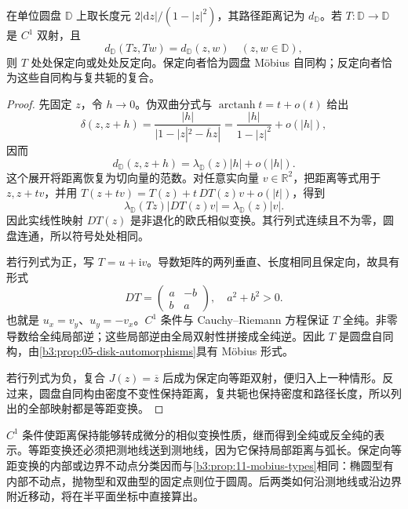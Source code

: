 \begin{proposition}[圆盘的光滑等距变换]\label{b3:prop:13-disk-isometries}
在单位圆盘 \(\mathbb D\) 上取长度元 \(2|\mathrm dz|/(1-|z|^2)\)，其路径距离记为 \(d_{\mathbb D}\)。若 \(T:\mathbb D\to\mathbb D\) 是 \(C^1\) 双射，且
\[
 d_{\mathbb D}(Tz,Tw)=d_{\mathbb D}(z,w)
 \quad(z,w\in\mathbb D),
\]
则 \(T\) 处处保定向或处处反定向。保定向者恰为圆盘 Möbius 自同构；反定向者恰为这些自同构与复共轭的复合。
\end{proposition}
\begin{proof}
先固定 \(z\)，令 \(h\to0\)。伪双曲分式与 \(\operatorname{arctanh}t=t+o(t)\) 给出
\[
 \delta(z,z+h)
 =\frac{|h|}{|1-|z|^2-\overline h z|}
 =\frac{|h|}{1-|z|^2}+o(|h|),
\]
因而
\[
 d_{\mathbb D}(z,z+h)
 =\lambda_{\mathbb D}(z)|h|+o(|h|).
\]
这个展开将距离恢复为切向量的范数。对任意实向量 \(v\in\mathbb R^2\)，把距离等式用于 \(z,z+tv\)，并用
\(T(z+tv)=T(z)+t\,DT(z)v+o(|t|)\)，得到
\[
 \lambda_{\mathbb D}(Tz)|DT(z)v|
 =\lambda_{\mathbb D}(z)|v|.
\]
因此实线性映射 \(DT(z)\) 是非退化的欧氏相似变换。其行列式连续且不为零，圆盘连通，所以符号处处相同。

若行列式为正，写 \(T=u+\mathrm iv\)。导数矩阵的两列垂直、长度相同且保定向，故具有形式
\[
 DT=\begin{pmatrix}a&-b\\b&a\end{pmatrix},
 \quad a^2+b^2>0.
\]
也就是 \(u_x=v_y\)、\(u_y=-v_x\)。\(C^1\) 条件与 Cauchy--Riemann 方程保证 \(T\) 全纯。非零导数给全纯局部逆；这些局部逆由全局双射性拼接成全纯逆。因此 \(T\) 是圆盘自同构，由\cref{b3:prop:05-disk-automorphisms}具有 Möbius 形式。

若行列式为负，复合 \(J(z)=\overline z\) 后成为保定向等距双射，便归入上一种情形。反过来，圆盘自同构由密度不变性保持距离，复共轭也保持密度和路径长度，所以列出的全部映射都是等距变换。
\end{proof}

\(C^1\) 条件使距离保持能够转成微分的相似变换性质，继而得到全纯或反全纯的表示。等距变换还必须把测地线送到测地线，因为它保持局部距离与弧长。保定向等距变换的内部或边界不动点分类因而与\cref{b3:prop:11-mobius-types}相同：椭圆型有内部不动点，抛物型和双曲型的固定点则位于圆周。后两类如何沿测地线或沿边界附近移动，将在半平面坐标中直接算出。
